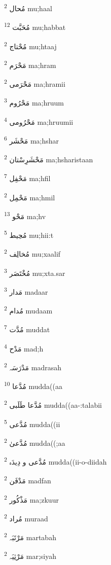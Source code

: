 \documentclass[12pt]{article}
\begin{document}
\begin{RTL}
\begin{multicols}{5}
{\ur مُحال}   \textsuperscript{2} mu;haal

{\ur مُحَبَّت}   \textsuperscript{12} mu;habbat

{\ur مُحْتاج}   \textsuperscript{2} mu;htaaj

{\ur مَحْرَم}   \textsuperscript{2} ma;hram

{\ur مَحْرَمی}   \textsuperscript{2} ma;hramii

{\ur مَحْرُوم}   \textsuperscript{3} ma;hruum

{\ur مَحْرُومی}   \textsuperscript{4} ma;hruumii

{\ur مَحْشَر}   \textsuperscript{6} ma;hshar

{\ur مَحْشَرِسْتان}   \textsuperscript{2} ma;hsharistaan

{\ur مَحْفِل}   \textsuperscript{7} ma;hfil

{\ur مَحْمِل}   \textsuperscript{2} ma;hmil

{\ur مَحْو}   \textsuperscript{13} ma;hv

{\ur مُحِیط}   \textsuperscript{5} mu;hii:t

{\ur مُخالِف}   \textsuperscript{2} mu;xaalif

{\ur مُخْتَصَر}   \textsuperscript{3} mu;xta.sar

{\ur مَدار}   \textsuperscript{3} madaar

{\ur مُدام}   \textsuperscript{2} mudaam

{\ur مُدَّت}   \textsuperscript{7} muddat

{\ur مَدْح}   \textsuperscript{4} mad;h

{\ur مَدْرَسَہ}   \textsuperscript{2} madrasah

{\ur مُدَّعا}   \textsuperscript{10} mudda((aa

{\ur مُدَّعا طَلَبی}   \textsuperscript{2} mudda((aa-:talabii

{\ur مُدَّعی}   \textsuperscript{5} mudda((ii

{\ur مُدَّعیٰ}   \textsuperscript{2} mudda((;aa

{\ur مُدَّعی و دِیدَہ}   \textsuperscript{2} mudda((ii-o-diidah

{\ur مَدْفَن}   \textsuperscript{2} madfan

{\ur مَذْکُور}   \textsuperscript{2} ma;zkuur

{\ur مُراد}   \textsuperscript{2} muraad

{\ur مَرْتَبَہ}   \textsuperscript{2} martabah

{\ur مَرْثِیَہ}   \textsuperscript{2} mar;siyah


\end{multicols}
\end{RTL}
\end{document}
